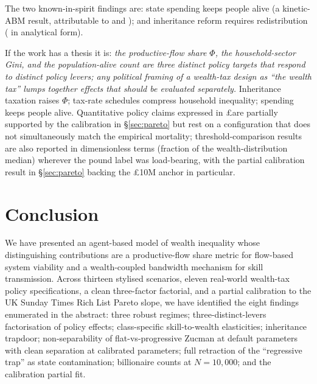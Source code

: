 \documentclass[11pt]{article}
\begin{document}
The two known-in-spirit findings are: state spending keeps people
alive (a kinetic-ABM result, attributable to
\citet{bertotti2018modanese} and \citet{cardoso2025wealth}); and
inheritance reform requires redistribution
(\citealp{piketty2013theory} in analytical form).

If the work has a thesis it is: \emph{the productive-flow share
$\Phi$, the household-sector Gini, and the population-alive count
are three distinct policy targets that respond to distinct policy
levers; any political framing of a wealth-tax design as ``the
wealth tax'' lumps together effects that should be evaluated
separately.} Inheritance taxation raises $\Phi$; tax-rate schedules
compress household inequality; spending keeps people alive.
Quantitative policy claims expressed in \pounds are partially
supported by the calibration in \S\ref{sec:pareto} but rest on a
configuration that does not simultaneously match the empirical
mortality; threshold-comparison results are also reported in
dimensionless terms (fraction of the wealth-distribution
median) wherever the pound label was load-bearing, with the partial
calibration result in \S\ref{sec:pareto} backing the
\pounds10M anchor in particular.

\section{Conclusion}

We have presented an agent-based model of wealth inequality whose
distinguishing contributions are a productive-flow share metric
for flow-based system viability and a wealth-coupled bandwidth
mechanism for skill transmission. Across thirteen stylised
scenarios, eleven real-world wealth-tax policy specifications, a
clean three-factor factorial, and a partial calibration to the UK
Sunday Times Rich List Pareto slope, we have identified the eight
findings enumerated in the abstract: three robust regimes;
three-distinct-levers factorisation of policy effects; class-specific
skill-to-wealth elasticities; inheritance trapdoor; non-separability
of flat-vs-progressive Zucman at default parameters with clean
separation at calibrated parameters; full retraction of the
``regressive trap'' as state contamination; billionaire counts at
$N=10{,}000$; and the calibration partial fit.
\end{document}

